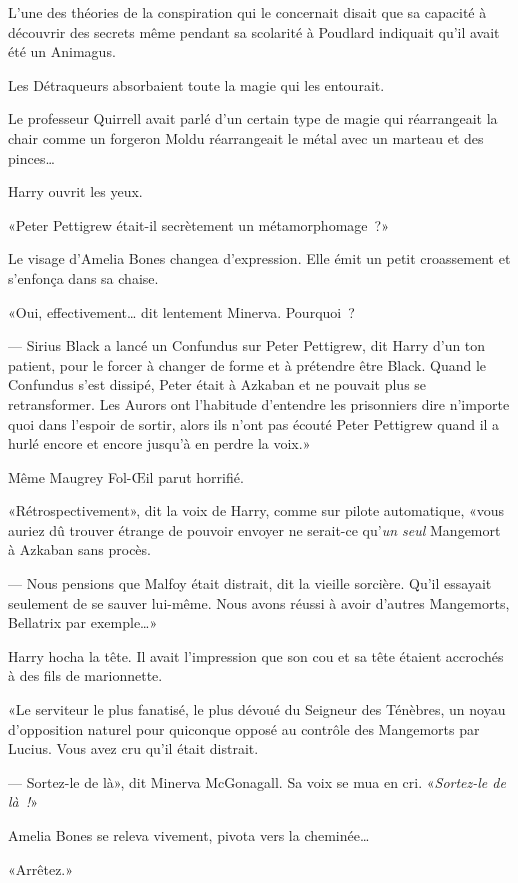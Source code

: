 L'une des théories de la conspiration qui le concernait disait que sa capacité à découvrir des secrets même pendant sa scolarité à Poudlard indiquait qu'il avait été un Animagus.

Les Détraqueurs absorbaient toute la magie qui les entourait.

Le professeur Quirrell avait parlé d'un certain type de magie qui réarrangeait la chair comme un forgeron Moldu réarrangeait le métal avec un marteau et des pinces…

Harry ouvrit les yeux.

«Peter Pettigrew était-il secrètement un métamorphomage~?»

Le visage d'Amelia Bones changea d'expression. Elle émit un petit croassement et s'enfonça dans sa chaise.

«Oui, effectivement… dit lentement Minerva. Pourquoi~?

--- Sirius Black a lancé un Confundus sur Peter Pettigrew, dit Harry d'un ton patient, pour le forcer à changer de forme et à prétendre être Black. Quand le Confundus s'est dissipé, Peter était à Azkaban et ne pouvait plus se retransformer. Les Aurors ont l'habitude d'entendre les prisonniers dire n'importe quoi dans l'espoir de sortir, alors ils n'ont pas écouté Peter Pettigrew quand il a hurlé encore et encore jusqu'à en perdre la voix.»

Même Maugrey Fol-Œil parut horrifié.

«Rétrospectivement», dit la voix de Harry, comme sur pilote automatique, «vous auriez dû trouver étrange de pouvoir envoyer ne serait-ce qu'\emph{un seul} Mangemort à Azkaban sans procès.

--- Nous pensions que Malfoy était distrait, dit la vieille sorcière. Qu'il essayait seulement de se sauver lui-même. Nous avons réussi à avoir d'autres Mangemorts, Bellatrix par exemple…»

Harry hocha la tête. Il avait l'impression que son cou et sa tête étaient accrochés à des fils de marionnette.

«Le serviteur le plus fanatisé, le plus dévoué du Seigneur des Ténèbres, un noyau d'opposition naturel pour quiconque opposé au contrôle des Mangemorts par Lucius. Vous avez cru qu'il était distrait.

--- Sortez-le de là», dit Minerva McGonagall. Sa voix se mua en cri. «\emph{Sortez-le de là~!}»

Amelia Bones se releva vivement, pivota vers la cheminée…

«Arrêtez.»

